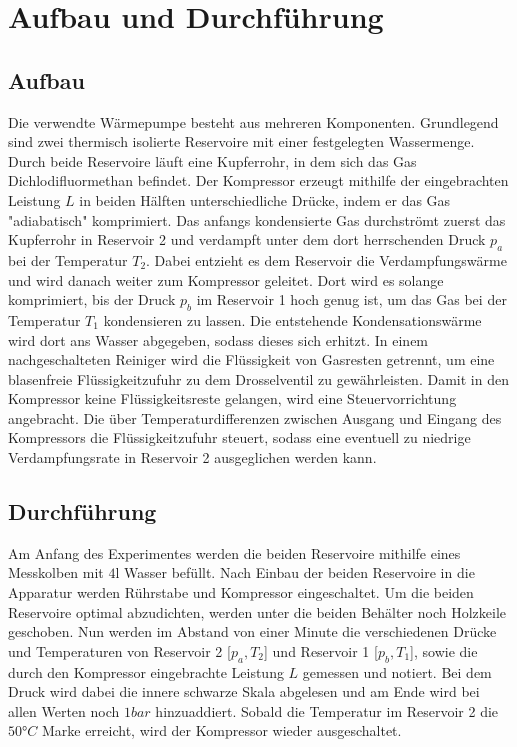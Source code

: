 \section{Aufbau und Durchführung}

\subsection{Aufbau}

Die verwendte Wärmepumpe besteht aus mehreren Komponenten. Grundlegend sind zwei thermisch isolierte Reservoire mit einer festgelegten
Wassermenge. Durch beide Reservoire läuft eine Kupferrohr, in dem sich das Gas Dichlodifluormethan befindet. Der Kompressor erzeugt
mithilfe der eingebrachten Leistung $L$ in beiden
Hälften unterschiedliche Drücke, indem er das Gas "adiabatisch" komprimiert. Das anfangs kondensierte Gas durchströmt zuerst das Kupferrohr in Reservoir 2 und
verdampft unter dem dort herrschenden Druck $p_a$ bei der Temperatur $T_2$. Dabei entzieht es dem Reservoir die Verdampfungswärme und wird danach
weiter zum Kompressor geleitet. Dort wird es solange komprimiert, bis der Druck $p_b$ im Reservoir 1 hoch genug ist, um das Gas bei der
Temperatur $T_1$ kondensieren zu lassen. Die entstehende
Kondensationswärme wird dort ans Wasser abgegeben, sodass dieses sich erhitzt. In einem nachgeschalteten Reiniger wird die Flüssigkeit
von Gasresten getrennt, um eine blasenfreie Flüssigkeitzufuhr zu dem Drosselventil zu gewährleisten. Damit in den Kompressor keine
Flüssigkeitsreste gelangen, wird eine Steuervorrichtung angebracht. Die über Temperaturdifferenzen zwischen Ausgang und Eingang
des Kompressors die Flüssigkeitzufuhr steuert, sodass eine eventuell zu niedrige Verdampfungsrate in Reservoir 2 ausgeglichen werden kann.

\subsection{Durchführung}

Am Anfang des Experimentes werden die beiden Reservoire mithilfe eines Messkolben mit $4 \mathup{l}$ Wasser befüllt. Nach Einbau der beiden Reservoire
in die Apparatur werden Rührstabe und Kompressor eingeschaltet. Um die beiden Reservoire optimal abzudichten, werden unter die beiden Behälter
noch Holzkeile geschoben. Nun werden im Abstand von einer Minute die verschiedenen Drücke und Temperaturen
von Reservoir 2 [$p_a, T_2$] und Reservoir 1 [$p_b, T_1$], sowie die durch den Kompressor eingebrachte Leistung $L$ gemessen und notiert. Bei dem Druck
wird dabei die innere schwarze Skala abgelesen und am Ende wird bei allen Werten noch $1 bar$ hinzuaddiert. Sobald
die Temperatur im Reservoir 2 die $50 °C$ Marke erreicht, wird der Kompressor wieder ausgeschaltet.

